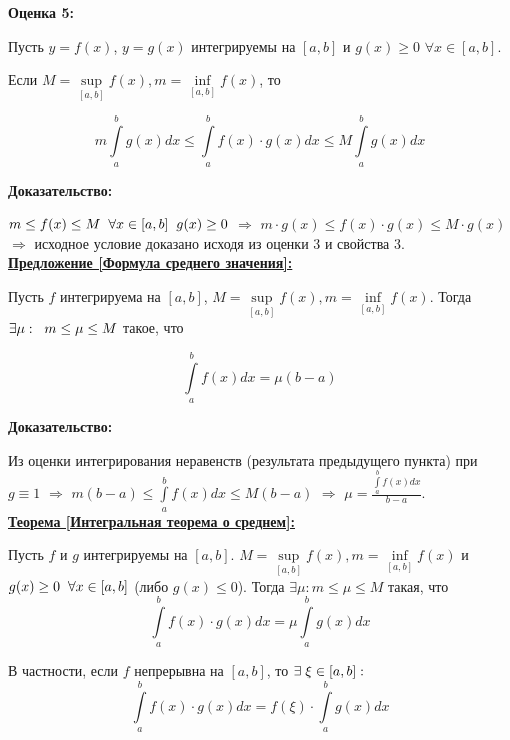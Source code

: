 \documentclass[a4paper,12pt]{article} %
\begin{document}
    \textbf{Оценка 5:}
    
    Пусть $ y = f(x) $, $ y = g(x) $ интегрируемы на $ [a, b] $ и $ g(x) \geq 0 $ $\forall x \in [a, b] $.
    
    Если $ M = \sup\limits_{[a, b]} f (x), m = \inf\limits_{[a, b]} f(x) $, то
    
    $$ m\int\limits_a^b g(x)dx \leq \int\limits_a^b f(x) \cdot g(x)dx \leq M \int\limits_a^b g(x)dx $$
    
    \textbf{Доказательство:}
    
    $ m \leq f (x) \leq M \hspace{2 mm} \forall x \in [a, b]  \hspace{2 mm} g (x) \geq 0 $ $ \Rightarrow $
    $ m \cdot g(x) \leq f(x) \cdot g(x) \leq M \cdot g (x) $ \\ [2 mm] $ \Rightarrow $ исходное условие доказано исходя из оценки 3 и свойства 3.\\
    
\underline{\textbf{Предложение [Формула среднего значения]: }}

Пусть $ f $ интегрируема на $ [a, b] $, $ M = \sup\limits_{[a, b]} f(x), m = \inf\limits_{[a, b]} f(x) $. Тогда $ \exists \mu: \hspace{2 mm} m \leq \mu \leq M $ такое, что

$$ \int\limits_a^b f(x)dx = \mu (b - a)$$

\textbf{Доказательство:}

Из оценки интегрирования неравенств (результата предыдущего пункта) при $ g \equiv 1 $ $\Rightarrow$ $ m (b - a) \leq \int\limits_a^b f (x)dx \leq M(b - a) $ $ \Rightarrow $ $\displaystyle \mu = \frac {\int\limits_a^b f(x)dx}{b -a }$.\\

\underline{\textbf{Теорема [Интегральная теорема о среднем]:}}

Пусть $ f $ и $ g $ интегрируемы на $ [a, b] $. $ M = \sup\limits_{[a,b]} f(x), m = \inf\limits_{[a,b]} f(x) $ и $ g(x) \geq 0 \hspace{2mm} \forall x \in [a, b] $ (либо  $g (x) \leq 0 $). Тогда $\exists \mu: m \leq \mu \leq M $ такая, что
$$ \int\limits_a^b f(x) \cdot g(x)dx = \mu \int\limits_a^b g(x)dx$$

В частности, если $ f $ непрерывна на $ [a, b] $, то $\exists \hspace{1 mm} \xi \in [a,b]: $ \\ 
$$ \int\limits_a^b f(x) \cdot g(x)dx = f(\xi) \cdot \int\limits_a^b g(x)dx$$
\end{document}
